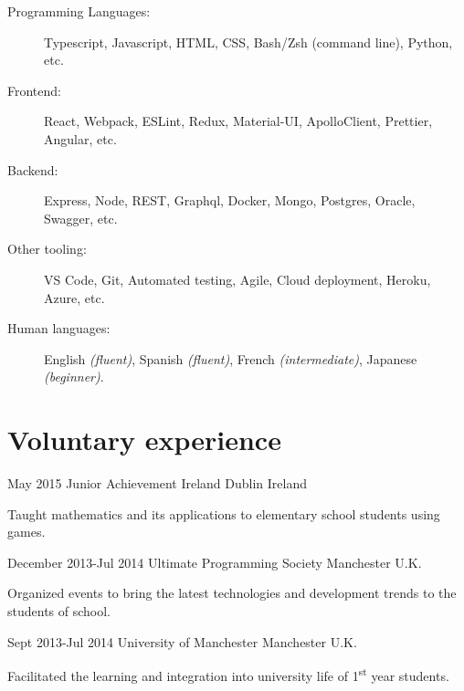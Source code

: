 \documentclass[10pt]{CurriculumVitae}
\begin{document}
    \begin{description}
      \item[Programming Languages:] Typescript, Javascript, HTML, CSS, Bash/Zsh (command line), Python, etc.
      \item[Frontend:] React, Webpack, ESLint, Redux, Material-UI, ApolloClient, Prettier, Angular, etc.
      \item[Backend:] Express, Node, REST, Graphql, Docker, Mongo, Postgres, Oracle, Swagger, etc. 
      \item[Other tooling:] VS Code, Git, Automated testing, Agile, Cloud deployment, Heroku, Azure, etc.
      \item[Human languages:] English \emph{(fluent)}, Spanish \emph{(fluent)}, French \emph{(intermediate)}, Japanese \emph{(beginner)}.
    \end{description}


  \section{Voluntary experience}
     
      {May 2015}
      {Junior Achievement Ireland}
      {Dublin}
      {Ireland}
      {
         \item Taught mathematics and its applications to elementary school students using games.
      }

      {December 2013-Jul 2014}
      {Ultimate Programming Society}
      {Manchester}
      {U.K.}
      {
         \item Organized events to bring the latest technologies and development trends to the students of school.
      }

      {Sept 2013-Jul 2014}
      {University of Manchester}
      {Manchester}
      {U.K.}
      {
         \item Facilitated the learning and integration into university life of 1\textsuperscript{st} year students.
      }
\end{document}
